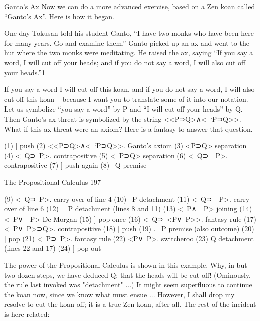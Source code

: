                                        Ganto’s Ax
Now we can do a more advanced exercise, based on a Zen koan called “Ganto’s Ax”.
Here is how it began.

   One day Tokusan told his student Ganto, “I have two monks who have been here
   for many years. Go and examine them.” Ganto picked up an ax and went to the hut
   where the two monks were meditating. He raised the ax, saying “If you say a word,
   I will cut off your heads; and if you do not say a word, I will also cut off your
   heads.”1

If you say a word I will cut off this koan, and if you do not say a word, I will also cut off
this koan – because I want you to translate some of it into our notation. Let us symbolize
“you say a word” by P and “I will cut off your heads” by Q. Then Ganto’s ax threat is
symbolized by the string <<P⊃Q>∧<~`P⊃Q>>. What if this ax threat were an axiom?
Here is a fantasy to answer that question.

(1) [                                         push
(2)   <<P⊃Q>∧<~`P⊃Q>>.                        Ganto’s axiom
(3)   <P⊃Q>                                   separation
(4)   <~Q⊃~P>.                                contrapositive
(5)   <~P⊃Q>                                  separation
(6)   <~Q⊃~~P>.                               contrapositive
(7)    ]                                      push again
(8)      ~Q                                   premise

The Propositional Calculus                                                               197

(9)      <~Q⊃~P>.                     carry-over of line 4
(10)      ~P                          detachment
(11)     <~Q⊃~~P>.                    carry-over of line 6
(12)      ~~P                         detachment (lines 8 and 11)
(13)     <~P∧~~P>                     joining
(14)      <~P∨~~P>                    De Morgan
(15)   ]                              pop once
(16)   <~Q⊃~<P∨~P>>.                  fantasy rule
(17)   <~P∨~P>⊃Q>.                    contrapositive
(18) [                                push
(19)   . ~P                           premise (also outcome)
(20) ]                                pop
(21)   <~P⊃~P>.                       fantasy rule
(22)   <P∨~P>.                        switcheroo
(23)   Q                              detachment (lines 22 and 17)
(24) ]                                pop out

The power of the Propositional Calculus is shown in this example. Why, in but two dozen
steps, we have deduced Q: that the heads will be cut off! (Ominously, the rule last
invoked was "detachment" ...) It might seem superfluous to continue the koan now, since
we know what must ensue ... However, I shall drop my resolve to cut the koan off; it is a
true Zen koan, after all. The rest of the incident is here related:

